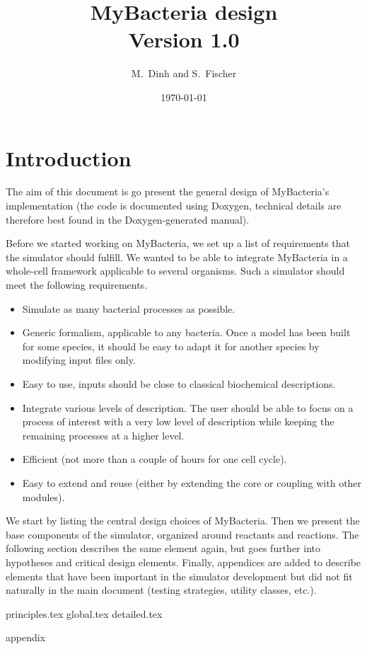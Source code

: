 \documentclass[12pt]{scrartcl}
\theoremstyle{definition}
\theoremstyle{remark}
\numberwithin{equation}{section}
\begin{document}
\title{MyBacteria design \\ Version 1.0}%
\author{M.~Dinh and S.~Fischer}%
\date{\today}%
\maketitle

\newpage

\tableofcontents

\newpage

\section{Introduction}

The aim of this document is go present the general design of MyBacteria's implementation
(the code is documented using Doxygen, technical details are therefore best found in the Doxygen-generated manual).

Before we started working on MyBacteria,
we set up a list of requirements that the simulator should fulfill.
We wanted to be able to integrate MyBacteria in a whole-cell framework
applicable to several organisms.
Such a simulator should meet the following requirements.
\begin{itemize}
  \item Simulate as many bacterial processes as possible.
  \item Generic formalism, applicable to any bacteria.
  Once a model has been built for some species, it should be easy to adapt it
  for another species by modifying input files only.
  \item Easy to use, inputs should be close to classical biochemical
  descriptions.
  \item Integrate various levels of description.
  The user should be able to focus on a process of interest
  with a very low level of description
  while keeping the remaining processes at a higher level.
  \item Efficient (not more than a couple of hours for one cell cycle).
  \item Easy to extend and reuse
  (either by extending the core or coupling with other modules).
\end{itemize}

We start by listing the central design choices of MyBacteria.
Then we present the base components of the simulator, organized around reactants and reactions.
The following section describes the same element again, but goes further into hypotheses and critical design elements.
Finally, appendices are added to describe elements that have been important
in the simulator development but did not fit naturally in the main document
(testing strategies, utility classes, etc.).

{principles.tex}
{global.tex}
{detailed.tex}
\clearpage

\appendix
{appendix}
\clearpage



\end{document}
